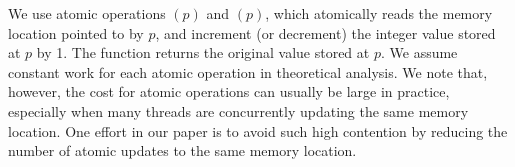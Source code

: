 We use atomic operations \atominc{}$(p)$ and \atomdec{}$(p)$, which atomically reads the memory location pointed to by $p$, and increment (or decrement) the integer value stored at $p$ by 1. The function returns the original value stored at $p$. 
We assume constant work for each atomic operation in theoretical analysis.
We note that, however, the cost for atomic operations can usually be large in practice, especially when many threads are concurrently
updating the same memory location. 
One effort in our paper is to avoid such high contention by reducing the number of atomic updates to the same memory location. 


% 
% 

% 
% 

